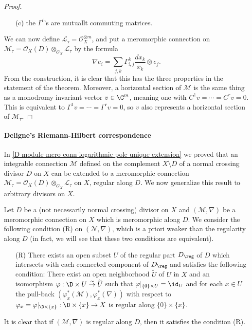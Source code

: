\begin{proof}
\begin{enumerate}
    \item[(c)] the $\Gamma^i$'s are mutuallt commuting matrices.
\end{enumerate}
We can now define $\mathscr{L}_\tau=\mathscr{O}_X^{\otimes m}$, and put a meromorphic connection on $\mathscr{M}_\tau=\mathscr{O}_X(D)\otimes_{\mathscr{O}_X}\mathscr{L}_\tau$ by the formula
\[\nabla e_i=\sum_{j,k}\Gamma_{i,j}^k\frac{dx_k}{x_k}\otimes e_j.\]
From the construction, it is clear that this has the three properties in the statement of the theorem. Moreover, a horizontal section of $\mathscr{M}$ is the same thing as a monodromy invariant vector $v\in\C^m$, meaning one with $C^1v=\cdots=C^rv=0$. This is equivalent to $\Gamma^1v=\cdots=\Gamma^rv=0$, so $v$ also represents a horizontal section of $\mathscr{M}_\tau$.
\end{proof}

\paragraph{Deligne's Riemann-Hilbert correspondence}
In \cref{D-module mero conn logarithmic pole unique extension} we proved that an integrable connection $\mathscr{M}$ defined on the complement $X\setminus D$ of a normal crossing divisor $D$ on $X$ can be extended to a meromorphic connection $\mathscr{M}_\tau=\mathscr{O}_X(D)\otimes_{\mathscr{O}_X}\mathscr{L}_\tau$ on $X$, regular along $D$. We now generalize this result to arbitrary divisors on $X$.\par
Let $D$ be a (not necessarily normal crossing) divisor on $X$ and $(\mathscr{M},\nabla)$ be a meromorphic connection on $X$ which is meromorphic along $D$. We consider the following condition (R) on $(\mathscr{N},\nabla)$, which is a priori weaker than the regularity along $D$ (in fact, we will see that these two conditions are equivalent).
\begin{enumerate}[leftmargin=40pt]
    \item[(R)] There exists an open subset $U$ of the regular part $D_{\reg}$ of $D$ which intersects with each connected component of $D_{\reg}$ and satisfies the following condition: There exist an open neighborhood $\widetilde{U}$ of $U$ in $X$ and an isomorphism $\varphi:\D\times U\stackrel{\sim}{\to}\widetilde{U}$ such that $\varphi|_{\{0\}\times U}=\id_U$ and for each $x\in U$ the pull-back $(\varphi_x^*(\mathscr{M}),\varphi_x^*(\nabla))$ with respcet to $\varphi_x=\varphi|_{\D\times\{x\}}:\D\times\{x\}\to X$ is regular along $\{0\}\times\{x\}$.
\end{enumerate}
It is clear that if $(\mathscr{M},\nabla)$ is regular along $D$, then it satisfies the condition (R).

